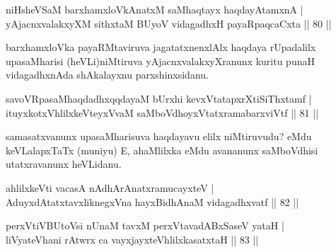 \begin{shl}
niHsheVSaM barxhamxloVkAnatxM saMhaqtayx haqdayAtamxnA |\\
yAjacnxvalakxyXM sithxtaM BUyoV vidagadhxH payaRpaqcaCxta \hfill || 80 ||
\end{shl}

\begin{artha}
barxhamxloVka payaRMtaviruva jagatatxnenxlAlx haqdaya rUpadalilx upasaMharisi (heVLi)niMtiruva yAjacnxvalakxyXranunx kuritu punaH vidagadhxnAda shAkalayxnu parxshinxsidanu.
\end{artha}

\begin{shl}
savoVRpasaMhaqdadhxqqdayaM bUrxhi kevxVtatapxrXtiSiThxtamf |\\
ituyxkotxV\s hlilxkeVteyxVvaM saMboVdhoyxVtatxramabarxviVtf \hfill || 81 ||
\end{shl}

\begin{artha}
samasatxvanunx upasaMharisuva haqdayavu elilx niMtiruvudu? eMdu keVLalapxTaTx (muniyu) E, ahaMlilxka eMdu avananunx saMboVdhisi utatxravanunx heVLidanu.
\end{artha}

\begin{shl}
ahlilxkeVti vacasA nA\s \s dhArAnatxramucayxteV |\\
\footnotetext[1]{}AduyxdAtatxtavxliknegxVna hayxBidhAnaM \footnotetext[2]{}vidagadhxvatf \hfill || 82 ||
\end{shl}

\begin{shl}
perxVtiVBUtoV\s si nUnaM tavxM perxVtavadABxSaseV yataH |\\
liVyateV\s hani rAtwrx ca vayxjayxteV\s hlilxkasatxtaH \hfill || 83 ||
\end{shl}

